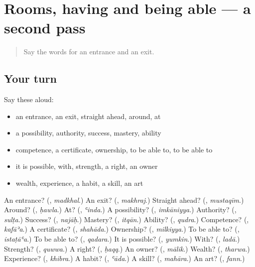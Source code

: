 \section[(dialogue)]{Rooms, having and being able — a second pass}

\label{lesson:AR-R109-second-pass-rooms-having-and-being-able}



\begin{quote}
Say the words for an entrance and an exit.
\end{quote}

\subsection*{Your turn}
Say these aloud:

\begin{itemize}
\raggedright
  \item an entrance, an exit, straight ahead, around, at
  \item a possibility, authority, success, mastery, ability
  \item competence, a certificate, ownership, to be able to, to be able to
  \item it is possible, with, strength, a right, an owner
  \item wealth, experience, a habit, a skill, an art
\end{itemize}

\begin{tcolorbox}[breakable,colback=teal!4,colframe=teal!35!black,title={Before you move on}]
An entrance? (\textbf{}, \emph{madkhal}.) An exit? (\textbf{}, \emph{makhraj}.) Straight ahead? (\textbf{}, \emph{mustaqīm}.) Around? (\textbf{}, \emph{ḥawla}.) At? (\textbf{}, \emph{ʿinda}.) A possibility? (\textbf{}, \emph{imkāniyya}.) Authority? (\textbf{}, \emph{sulṭa}.) Success? (\textbf{}, \emph{najāḥ}.) Mastery? (\textbf{}, \emph{itqān}.) Ability? (\textbf{}, \emph{qudra}.) Competence? (\textbf{}, \emph{kafāʾa}.) A certificate? (\textbf{}, \emph{shahāda}.) Ownership? (\textbf{}, \emph{milkiyya}.) To be able to? (\textbf{}, \emph{istaṭāʿa}.) To be able to? (\textbf{}, \emph{qadara}.) It is possible? (\textbf{}, \emph{yumkin}.) With? (\textbf{}, \emph{ladā}.) Strength? (\textbf{}, \emph{quwwa}.) A right? (\textbf{}, \emph{ḥaqq}.) An owner? (\textbf{}, \emph{mālik}.) Wealth? (\textbf{}, \emph{tharwa}.) Experience? (\textbf{}, \emph{khibra}.) A habit? (\textbf{}, \emph{ʿāda}.) A skill? (\textbf{}, \emph{mahāra}.) An art? (\textbf{}, \emph{fann}.)
\end{tcolorbox}
